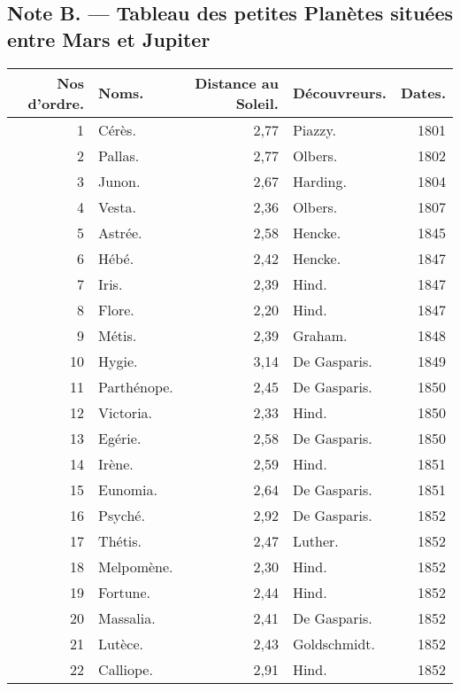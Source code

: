 \documentclass[a4paper, 11pt, oneside]{article}
\begin{document}
\subsection{Note B. --- Tableau des petites Planètes situées entre Mars et Jupiter}
\begin{center}
    \footnotesize
    \begin{longtable}{|r|l|r|l|r|}
    \hline
        \textbf{Nos d'ordre.} & \textbf{Noms.} & \textbf{Distance au Soleil.} & \textbf{Découvreurs.} & \textbf{Dates.} \\ \hline
        1 & Cérès. & 2,77 & Piazzy. & 1801 \\ \hline
        2 & Pallas. & 2,77 & Olbers. & 1802 \\ \hline
        3 & Junon. & 2,67 & Harding. & 1804 \\ \hline
        4 & Vesta. & 2,36 & Olbers. & 1807 \\ \hline
        5 & Astrée. & 2,58 & Hencke. & 1845 \\ \hline
        6 & Hébé. & 2,42 & Hencke. & 1847 \\ \hline
        7 & Iris. & 2,39 & Hind. & 1847 \\ \hline
        8 & Flore. & 2,20 & Hind. & 1847 \\ \hline
        9 & Métis. & 2,39 & Graham. & 1848 \\ \hline
        10 & Hygie. & 3,14 & De Gasparis. & 1849 \\ \hline
        11 & Parthénope. & 2,45 & De Gasparis. & 1850 \\ \hline
        12 & Victoria. & 2,33 & Hind. & 1850 \\ \hline
        13 & Egérie. & 2,58 & De Gasparis. & 1850 \\ \hline
        14 & Irène. & 2,59 & Hind. & 1851 \\ \hline
        15 & Eunomia. & 2,64 & De Gasparis. & 1851 \\ \hline
        16 & Psyché. & 2,92 & De Gasparis. & 1852 \\ \hline
        17 & Thétis. & 2,47 & Luther. & 1852 \\ \hline
        18 & Melpomène. & 2,30 & Hind. & 1852 \\ \hline
        19 & Fortune. & 2,44 & Hind. & 1852 \\ \hline
        20 & Massalia. & 2,41 & De Gasparis. & 1852 \\ \hline
        21 & Lutèce. & 2,43 & Goldschmidt. & 1852 \\ \hline
        22 & Calliope. & 2,91 & Hind. & 1852 \\ \hline

\end{longtable}
\end{center}
\end{document}
